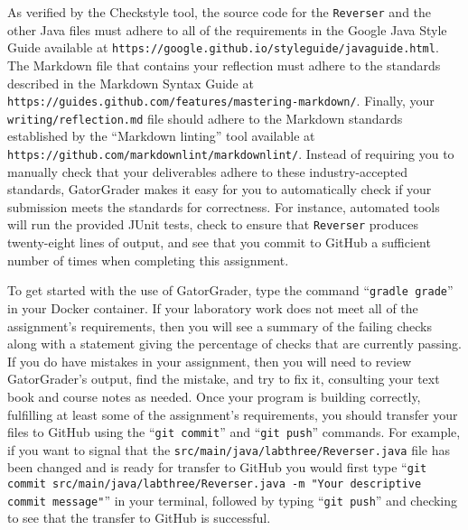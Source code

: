 \documentclass[11pt]{article}
\newcommand{\mainprogram}{\lstinline{Reverser}}
\newcommand{\mainprogramsource}{\lstinline{src/main/java/labthree/Reverser.java}}
\newcommand{\mainprogramoutput}{twenty-eight}
\newcommand{\reflection}{\lstinline{writing/reflection.md}}
\newcommand{\gatorgraderstart}{\command{gradle grade}}
\newcommand{\gitcommit}{\command{git commit}}
\newcommand{\gitpush}{\command{git push}}
\newcommand{\gitcommitmainprogram}{\command{git commit src/main/java/labthree/Reverser.java -m "Your
descriptive commit message"}}
\newcommand{\command}[1]{``\lstinline{#1}''}
\newcommand{\url}[1]{\lstinline{#1}}
\newcommand{\step}[1]{``{#1}''}
\begin{document}
As verified by the Checkstyle tool, the source code for the \mainprogram{} and
the other Java files must adhere to all of the requirements in the Google Java
Style Guide available at
\url{https://google.github.io/styleguide/javaguide.html}. The Markdown file that
contains your reflection must adhere to the standards described in the Markdown
Syntax Guide at \url{https://guides.github.com/features/mastering-markdown/}.
Finally, your \reflection{} file should adhere to the Markdown standards
established by the \step{Markdown linting} tool available at
\url{https://github.com/markdownlint/markdownlint/}. Instead of requiring you to
manually check that your deliverables adhere to these industry-accepted
standards, GatorGrader makes it easy for you to automatically check if your
submission meets the standards for correctness. For instance, automated tools
will run the provided JUnit tests, check to ensure that \mainprogram{} produces
\mainprogramoutput{} lines of output, and see that you commit to GitHub a
sufficient number of times when completing this assignment.

To get started with the use of GatorGrader, type the command \gatorgraderstart{}
in your Docker container. If your laboratory work does not meet all of the
assignment's requirements, then you will see a summary of the failing checks
along with a statement giving the percentage of checks that are currently
passing. If you do have mistakes in your assignment, then you will need to
review GatorGrader's output, find the mistake, and try to fix it, consulting
your text book and course notes as needed. Once your program is building
correctly, fulfilling at least some of the assignment's requirements, you should
transfer your files to GitHub using the \gitcommit{} and \gitpush{} commands.
For example, if you want to signal that the \mainprogramsource{} file has been
changed and is ready for transfer to GitHub you would first type
\gitcommitmainprogram{} in your terminal, followed by typing \gitpush{} and
checking to see that the transfer to GitHub is successful.
\end{document}
